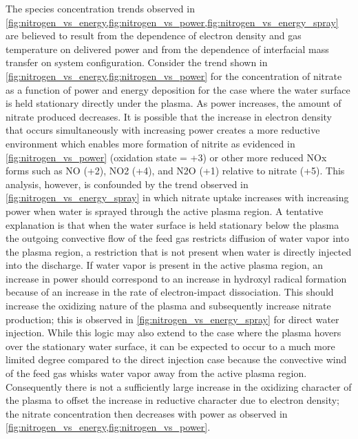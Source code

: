 The species concentration trends observed in \cref{fig:nitrogen_vs_energy,fig:nitrogen_vs_power,fig:nitrogen_vs_energy_spray} are believed to result from the dependence of electron density and gas temperature on delivered power and from the dependence of interfacial mass transfer on system configuration.   Consider the trend shown in \cref{fig:nitrogen_vs_energy,fig:nitrogen_vs_power} for the concentration of nitrate as a function of power and energy deposition for the case where the water surface is held stationary directly under the plasma.  As power increases, the amount of nitrate produced decreases.  It is possible that the increase in electron density that occurs simultaneously with increasing power creates a more reductive environment which enables more formation of  nitrite as evidenced in \cref{fig:nitrogen_vs_power} (oxidation state = +3) or other more reduced NOx forms such as NO (+2), NO2 (+4), and N2O (+1)  relative to nitrate (+5).  This analysis, however, is confounded by the trend observed in \cref{fig:nitrogen_vs_energy_spray} in which nitrate uptake increases with increasing power when water is sprayed through the active plasma region.  A tentative explanation is that when the water surface is held stationary below the plasma the outgoing convective flow of the feed gas restricts diffusion of water vapor into the plasma region, a restriction that is not present when water is directly injected into the discharge.  If water vapor is present in the active plasma region, an increase in power should correspond to an increase in hydroxyl radical formation because of an increase in the rate of electron-impact dissociation.  This should increase the oxidizing nature of the plasma and subsequently increase nitrate production; this is observed in \cref{fig:nitrogen_vs_energy_spray} for direct water injection.  While this logic may also extend to the case where the plasma hovers over the stationary water surface, it can be expected to occur to a much more limited degree compared to the direct injection case because the convective wind of the feed gas whisks water vapor away from the active plasma region.  Consequently there is not a sufficiently large increase in the oxidizing character of the plasma to offset the increase in reductive character due to electron density; the nitrate concentration then decreases with power as observed in \cref{fig:nitrogen_vs_energy,fig:nitrogen_vs_power}.

